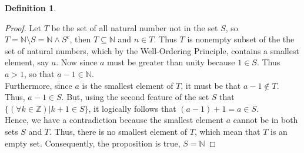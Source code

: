 \documentclass{book}
\theoremstyle{definition}
\newtheorem{definition}{Definition}[section]
\theoremstyle{remark}
\newcommand{\bb}[1]{\mathbb{#1}}
\begin{document}
\begin{definition}
\begin{proof}
    Let $T$ be the set of all natural number not in the set $S$, so $T = \bb{N} \setminus S = \bb{N} \wedge S^c$, then $T \subseteq \bb{N}$ and $n \in T$. Thus $T$ is nonempty subset of the the set of natural numbers, which by the Well-Ordering Principle, contains a smallest element, say $a$. Now since $a$ must be greater than  unity because $1 \in S$. Thus $a > 1$, so that $a -1 \in \bb{N}$. \\
    
    Furthermore, since $a$ is  the smallest element of $T$, it must be that $a-1 \notin T$. Thus, $a-1 \in S$. But, using the second feature of the set $S$ that $\{ (\forall k \in \bb{Z}) | k+1 \in S \}$, it logically follows that $(a-1) + 1 = a \in S$. \\
    
    Hence, we have a contradiction because the smallest element $a$ cannot be in both sets $S$ and $T$. Thus, there is no smallest element of $T$, which mean that $T$ is an empty set. Consequently, the proposition is true, $S = \bb{N}$
\end{proof}
\end{definition}
\end{document}
